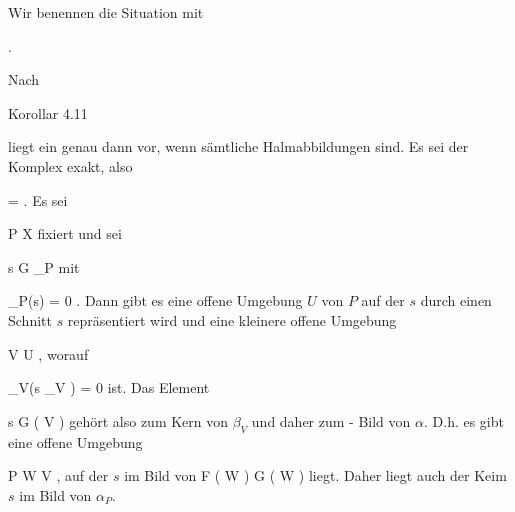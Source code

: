 {





Wir benennen die Situation mit

 { . }

Nach

Korollar 4.11

liegt ein
genau dann vor, wenn sämtliche Halmabbildungen
sind. Es sei der Komplex exakt, also

\mavergleichskettedisp
{\vergleichskette
{  \alpha
}
{ =} {  \beta
}
{ } {
}
{ } {
}
{ } {
}
}
{}{}{.}
Es sei

\mavergleichskette
{\vergleichskette
{P
}
{ \in }{ X
}
{  }{
}
{    }{
}
{   }{
}
}
{}{}{}
fixiert und sei

\mavergleichskette
{\vergleichskette
{s
}
{ \in }{ { \mathcal  G   }_P
}
{  }{
}
{    }{
}
{   }{
}
}
{}{}{}
mit

\mavergleichskette
{\vergleichskette
{ \beta_P(s)
}
{ = }{ 0
}
{  }{
}
{    }{
}
{   }{
}
}
{}{}{.}
Dann gibt es eine offene Umgebung $U$ von $P$ auf der $s$ durch einen Schnitt $s$ repräsentiert wird und eine kleinere offene Umgebung

\mavergleichskette
{\vergleichskette
{V
}
{ \subseteq }{ U
}
{  }{
}
{    }{
}
{   }{
}
}
{}{}{,}
worauf

\mavergleichskette
{\vergleichskette
{ \beta_V(s \vert_V )
}
{ = }{ 0
}
{  }{
}
{    }{
}
{   }{
}
}
{}{}{}
ist. Das Element
 {} {}

\mavergleichskette
{\vergleichskette
{s
}
{ \in }{ { \mathcal  G   }  \left(   V   \right)
}
{  }{
}
{    }{
}
{   }{
}
}
{}{}{}
gehört also zum Kern von $\beta_V$ und daher zum
 {-} {}Bild von $\alpha$. D.h. es gibt eine offene Umgebung

\mavergleichskette
{\vergleichskette
{P
}
{ \in }{ W
}
{ \subseteq }{ V
}
{    }{
}
{   }{
}
}
{}{}{,}
auf der $s$ im Bild von
 { { \mathcal  F   }  \left(   W   \right)  } { { \mathcal  G   }  \left(   W   \right)
} {}
liegt. Daher liegt auch der Keim $s$ im Bild von $\alpha_P$.




}





